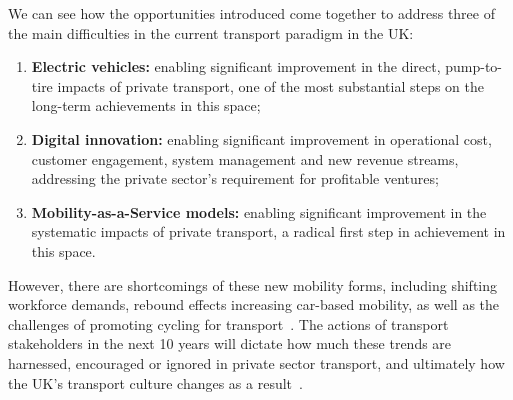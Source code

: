 \documentclass[b5paper,10pt]{article}
\begin{document}


We can see how the opportunities introduced come together to address
three of the main difficulties in the current transport paradigm in
the UK:

\begin{enumerate}
\item {\textbf{Electric vehicles:}} enabling significant improvement
in the direct, pump-to-tire impacts of private transport, one of the
most substantial steps on the long-term achievements in this space;
\item {\textbf{Digital innovation:}} enabling significant improvement
in operational cost, customer engagement, system management and new
revenue streams, addressing the private sector's requirement for
profitable ventures;
\item {\textbf{Mobility-as-a-Service models:}} enabling significant
improvement in the systematic impacts of private transport, a radical
first step in achievement in this space.
\end{enumerate}

However, there are shortcomings of these new mobility forms, including
shifting workforce demands, rebound effects increasing car-based
mobility, as well as the challenges of promoting cycling for
transport~\citep{handy-et-al:2014}. The actions of transport
stakeholders in the next 10 years will dictate how much these trends
are harnessed, encouraged or ignored in private sector transport, and
ultimately how the UK's transport culture changes as a
result~\citep{rode-et-al:2017}.
\end{document}
